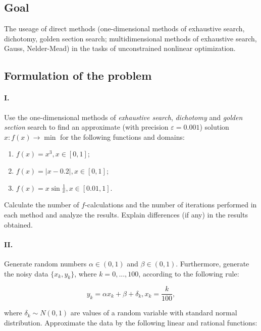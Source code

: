 \newpage
\subsection{Goal}

The useage of direct methods (one-dimensional methods of exhaustive search, dichotomy, golden section search; multidimensional methods of exhaustive search, Gauss, Nelder-Mead) in the tasks of unconstrained nonlinear optimization.

\subsection{Formulation of the problem}

\paragraph{I.}

Use the one-dimensional methods of \textit{exhaustive search}, \textit{dichotomy} and \textit{golden section} search to find an approximate (with precision $\varepsilon = 0.001$) solution $x: f(x) \rightarrow \min$  for the following functions and domains:

\begin{enumerate}
    \item $f(x) = x^3, x \in [0, 1]$;
    \item $f(x) = \lvert x - 0.2 \rvert, x \in [0, 1]$;
    \item $f(x) = x\sin{\frac{1}{x}}, x \in [0.01, 1]$.
\end{enumerate}

Calculate the number of $f$-calculations and the number of iterations performed in each method and analyze the results.
Explain differences (if any) in the results obtained.

\paragraph{II.}

Generate random numbers $\alpha \in (0, 1)$ and $\beta \in (0, 1)$.
Furthermore, generate the noisy data $\{x_k, y_k\}$, where $k = 0, ..., 100$, according to the following rule:

\begin{equation}
    y_k = \alpha x_k + \beta + \delta_k, x_k = \frac{k}{100},
\end{equation}

where $\delta_k \sim N(0, 1)$ are values of a random variable with standard normal distribution.
Approximate the data by the following linear and rational functions:

